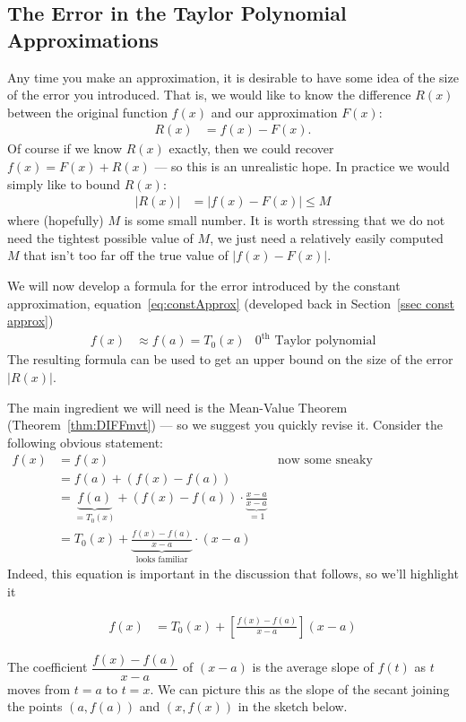 \goodbreak



\subsection{The Error in the Taylor Polynomial Approximations}\label{ssec taylor error}
Any time you make an approximation, it is desirable to have some idea
of the size of the error you introduced. That is, we would like to know the difference
$R(x)$ between the original function $f(x)$ and our approximation $F(x)$:
\begin{align*}
  R(x) &= f(x)-F(x).
\end{align*}
Of course if we know $R(x)$ exactly, then we could recover $f(x) = F(x)+R(x)$ --- so this
is an unrealistic hope. In practice we would simply like to bound $R(x)$:
\begin{align*}
  |R(x)| &= |f(x)-F(x)| \leq M
\end{align*}
where (hopefully) $M$ is some small number. It is worth stressing that we do not need the
tightest possible value of $M$, we just need a relatively easily computed $M$ that isn't
too far off the true value of $|f(x)-F(x)|$.


We will now develop a formula for the error introduced by the constant approximation,
equation~\eqref{eq:constApprox} (developed back in Section~\ref{ssec const
approx})
\begin{align*}
f(x)&\approx f(a) = T_0(x) & \text{$0^\mathrm{th}$ Taylor polynomial}
\end{align*}
The resulting formula can be used to get an upper bound on the size of the error
$|R(x)|$.

The main ingredient we will need is the Mean-Value Theorem (Theorem~\ref{thm:DIFFmvt})
--- so we suggest you quickly revise it. Consider the following obvious statement:
\begin{align*}
  f(x) &= f(x) & \text{now some sneaky manipulations}\\
  & = f(a) + (f(x)-f(a)) \\
  &= \underbrace{f(a)}_{=T_0(x)} + (f(x)-f(a)) \cdot \underbrace{\frac{x-a}{x-a}}_{=1} \\
  &= T_0(x) + \underbrace{\frac{f(x)-f(a)}{x-a}}_\text{looks familiar} \cdot (x-a)
\end{align*}
Indeed, this equation is important in the discussion that follows, so we'll highlight it
\begin{impeqn}\label{eq:taylorErrorA}
 \begin{align*}
  f(x) &= T_0(x) + \left[ \frac{f(x)-f(a)}{x-a} \right](x-a)
 \end{align*}
\end{impeqn}
The coefficient $\dfrac{f(x)-f(a)}{x-a}$ of $(x-a)$ is the average slope
of $f(t)$ as $t$ moves from $t=a$ to $t=x$. We can picture this as the slope of the
secant joining the points $(a,f(a))$ and $(x,f(x))$ in the sketch below.

